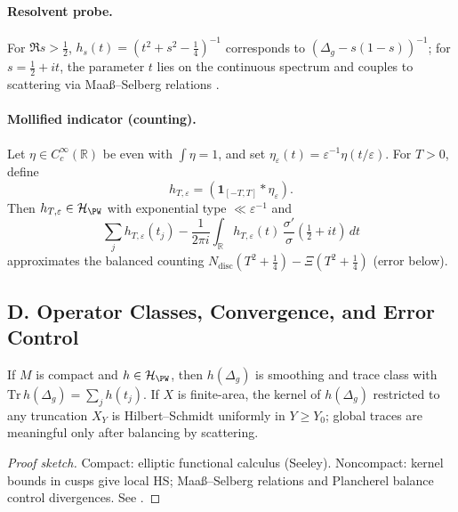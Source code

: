 \paragraph{Resolvent probe.}
For $\Re s>\tfrac12$, $h_s(t)=(t^2+s^2-\tfrac14)^{-1}$ corresponds to $(\Delta_g-s(1-s))^{-1}$; for $s=\tfrac12+it$, the parameter $t$ lies on the continuous spectrum and couples to scattering via Maaß–Selberg relations \cite{LaxPhillips1976}.

\paragraph{Mollified indicator (counting).}
Let $\eta\in C_c^\infty(\mathbb R)$ be even with $\int\eta=1$, and set $\eta_\varepsilon(t)=\varepsilon^{-1}\eta(t/\varepsilon)$. For $T>0$, define
\[
  h_{T,\varepsilon}=(\mathbf 1_{[-T,T]}*\eta_\varepsilon).
\]
Then $h_{T,\varepsilon}\in\mathcal H_{\PW}$ with exponential type $\ll\varepsilon^{-1}$ and
\[
  \sum_j h_{T,\varepsilon}(t_j) - \frac{1}{2\pi i}\int_{\mathbb R} h_{T,\varepsilon}(t)\,\frac{\sigma'}{\sigma}(\tfrac12+it)\,dt
\]
approximates the balanced counting $N_{\mathrm{disc}}(T^2+\tfrac14)-\Xi(T^2+\tfrac14)$ (error below).


\subsection*{D. Operator Classes, Convergence, and Error Control}
\label{subsec:operator-classes-sharp}

\begin{lemma}
\label{lem:tc-hs-sharp}
If $M$ is compact and $h\in\mathcal H_{\PW}$, then $h(\Delta_g)$ is smoothing and trace class with $\mathrm{Tr}\,h(\Delta_g)=\sum_j h(t_j)$. If $X$ is finite-area, the kernel of $h(\Delta_g)$ restricted to any truncation $X_Y$ is Hilbert–Schmidt uniformly in $Y\ge Y_0$; global traces are meaningful only after balancing by scattering.
\end{lemma}

\begin{proof}[Proof sketch]
Compact: elliptic functional calculus (Seeley). Noncompact: kernel bounds in cusps give local HS; Maaß–Selberg relations and Plancherel balance control divergences. See \cite{Seeley1967,Hejhal1983II,JorgensonLang}.
\end{proof}

